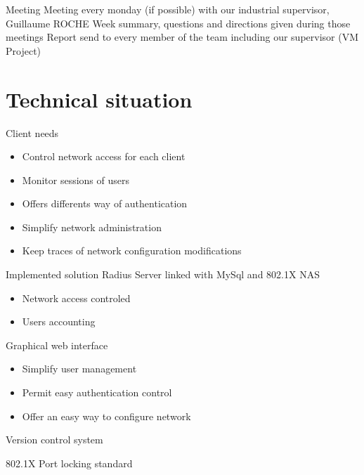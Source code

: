 \documentclass[12pt]{beamer}
\begin{document}
\begin{frame}{Meeting}
    Meeting every monday (if possible) with our industrial supervisor, Guillaume ROCHE
    \vfill
    Week summary, questions and directions given during those meetings
    \vfill
    Report send to every member of the team including our supervisor (VM Project)
\end{frame}

\section{Technical situation}

\begin{frame}{Client needs}
    \begin{itemize}
	\item Control network access for each client
	\vfill
	\item Monitor sessions of users
	\vfill 
	\item Offers differents way of authentication
	\vfill
	\item Simplify network administration
	\vfill
	\item Keep traces of network configuration modifications
    \end{itemize}
\end{frame}

\begin{frame}{Implemented solution}
    Radius Server linked with MySql and 802.1X NAS
    \begin{itemize}
	\item<1-2> Network access controled
	\item<2> Users accounting
    \end{itemize}
    \vfill
    Graphical web interface
    \begin{itemize}
	\item<0> Simplify user management
	\item<0> Permit easy authentication control
	\item<0> Offer an easy way to configure network
    \end{itemize}
    \vfill
    Version control system
\end{frame}
	
\begin{frame}{802.1X}
    Port locking standard

\end{frame}
\end{document}

